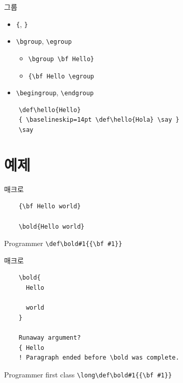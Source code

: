\documentclass{beamer}
\begin{document}
%
\begin{frame}[fragile]{그룹}
  \begin{itemize}
  \item \verb+{+, \verb+}+
  \item \verb+\bgroup+, \verb+\egroup+
    \begin{exampleblock}{}
      \begin{itemize}
      \item \verb+\bgroup \bf Hello}+
      \item \verb+{\bf Hello \egroup+
      \end{itemize}
    \end{exampleblock}
  \item \verb+\begingroup+, \verb+\endgroup+
  \end{itemize}

  \begin{verbatim}
    \def\hello{Hello}
    { \baselineskip=14pt \def\hello{Hola} \say }
    \say
  \end{verbatim}
\end{frame}


%
\section{예제}


%
\begin{frame}[fragile]{\texttt{\string\bold} 매크로}
  \begin{verbatim}
    {\bf Hello world}
    
    \bold{Hello world}
  \end{verbatim}
  \begin{alertblock}{Programmer}
    \verb+\def\bold#1{{\bf #1}}+
  \end{alertblock}
\end{frame}


%
\begin{frame}[fragile]{\texttt{\string\bold} 매크로}
  \begin{verbatim}
    \bold{
      Hello

      world
    }

    Runaway argument?
    { Hello
    ! Paragraph ended before \bold was complete.
  \end{verbatim}
  \begin{alertblock}{Programmer first class}
    \verb+\long\def\bold#1{{\bf #1}}+
  \end{alertblock}
\end{frame}
\end{document}

